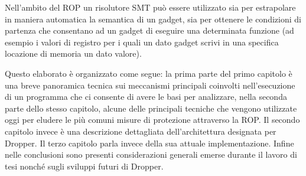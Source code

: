 Nell'ambito del ROP un risolutore SMT può essere utilizzato sia per
estrapolare in maniera automatica la semantica di un gadget, sia per
ottenere le condizioni di partenza che consentano ad un gadget di
eseguire una determinata funzione (ad esempio i valori di registro per
i quali un dato gadget scrivi in una specifica locazione di memoria un
dato valore).

Questo elaborato è organizzato come segue: la prima parte del primo
capitolo è una breve panoramica tecnica sui meccanismi principali
coinvolti nell'esecuzione di un programma che ci consente di avere le
basi per analizzare, nella seconda parte dello stesso capitolo, alcune
delle principali tecniche che vengono utilizzate oggi per eludere le
più comuni misure di protezione attraverso la ROP. Il secondo capitolo
invece è una descrizione dettagliata dell'architettura designata per
Dropper. Il terzo capitolo parla invece della sua attuale
implementazione. Infine nelle conclusioni sono presenti considerazioni
generali emerse durante il lavoro di tesi nonché sugli sviluppi futuri
di Dropper.


